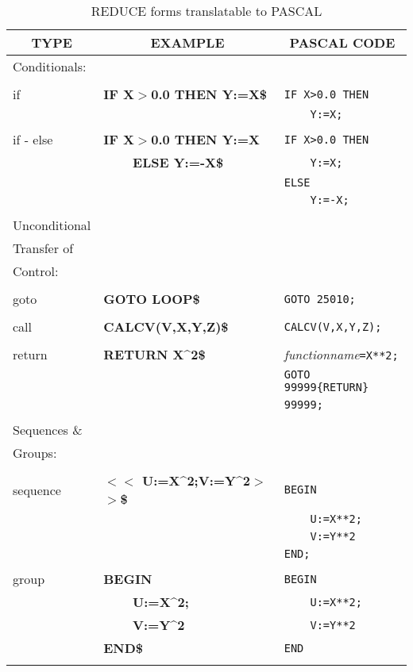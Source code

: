 \begin{table}
\begin{tabular}{||l|l|l||}\hline\hline
\multicolumn{1}{||c|}{\bf TYPE} & \multicolumn{1}{c|}{\bf EXAMPLE}
 & \multicolumn{1}{c||}{\bf PASCAL CODE} \\ \hline\hline
  Conditionals:&     &\\
&     &\\
    if  &{\bf IF X$>$0.0 THEN Y:=X\$} &\verb!IF X>0.0 THEN!\\
& &\verb!    Y:=X;!\\
&     &\\
    if - else  &{\bf IF X$>$0.0 THEN Y:=X} &\verb!IF X>0.0 THEN!\\
&{\bf\ \ \ \  ELSE Y:=-X\$}&\verb!    Y:=X;!\\
&     &\verb!ELSE!\\
&     &\verb!    Y:=-X;!\\
& & \\\hline
  Unconditional&     &\\
  Transfer of  &     &\\
  Control:     &     &\\
&     &\\
    goto&{\bf GOTO LOOP\$} &\verb!GOTO 25010;!\\
&     &\\
    call&{\bf CALCV(V,X,Y,Z)\$} &\verb!CALCV(V,X,Y,Z);!\\
&     &\\
    return     &{\bf RETURN X\^{}2\$} &{\it functionname\/}\verb!=X**2;!\\
&     &\verb!GOTO 99999{RETURN}!\\
&     &\verb!99999;!\\
& & \\\hline
Sequences \&    &     &\\
Groups: &     &\\
&     &\\
    sequence   &{\bf $<$$<$ U:=X\^{}2;V:=Y\^{}2$>$$>$\$}&\verb!BEGIN!\\
&&\verb!    U:=X**2;!\\
&&\verb!    V:=Y**2!\\
&&\verb!END;!\\
&     &\\
    group      &{\bf BEGIN}&\verb!BEGIN!\\
&{\bf\ \ \ \  U:=X\^{}2;}&\verb!    U:=X**2;!\\
&{\bf\ \ \ \  V:=Y\^{}2} &\verb!    V:=Y**2!\\
&{\bf END\$}&\verb!END!\\
& & \\\hline\hline
\end{tabular}
\caption{REDUCE forms translatable to PASCAL}
\end{table}

